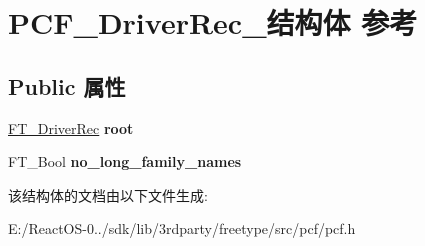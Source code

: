 \hypertarget{struct_p_c_f___driver_rec__}{}\section{P\+C\+F\+\_\+\+Driver\+Rec\+\_\+结构体 参考}
\label{struct_p_c_f___driver_rec__}
\subsection*{Public 属性}
\begin{DoxyCompactItemize}
\item 
\mbox{\label{struct_p_c_f___driver_rec___a024d199ceddc0a60ff57d8c5419f61fc}} 
\hyperlink{struct_f_t___driver_rec__}{F\+T\+\_\+\+Driver\+Rec} {\bfseries root}
\item 
\mbox{\label{struct_p_c_f___driver_rec___afdc073469ce3cfd60a078581d5dff9ba}} 
F\+T\+\_\+\+Bool {\bfseries no\+\_\+long\+\_\+family\+\_\+names}
\end{DoxyCompactItemize}


该结构体的文档由以下文件生成\+:\begin{DoxyCompactItemize}
\item 
E\+:/\+React\+O\+S-\/0../sdk/lib/3rdparty/freetype/src/pcf/pcf.\+h\end{DoxyCompactItemize}
